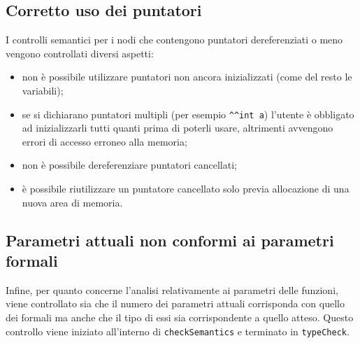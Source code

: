 \documentclass[../report.tex]{subfiles}
\begin{document}
\subsection{Corretto uso dei puntatori}\label{s:corretto-usi-puntatori}
I controlli semantici per i nodi che contengono puntatori dereferenziati o meno vengono controllati diversi aspetti:
\begin{itemize}
    \item non è possibile utilizzare puntatori non ancora inizializzati (come del resto le variabili);
    \item se si dichiarano puntatori multipli (per esempio \verb|^^int a|) l'utente è obbligato ad inizializzarli tutti quanti prima di poterli usare, altrimenti avvengono errori di accesso erroneo alla memoria;
    \item non è possibile dereferenziare puntatori cancellati;
    \item è possibile riutilizzare un puntatore cancellato solo previa allocazione di una nuova area di memoria.
\end{itemize}

\subsection{Parametri attuali non conformi ai parametri formali}\label{s:parametri-attuali-non-conformi-parametri-formali}
Infine, per quanto concerne l'analisi relativamente ai parametri delle funzioni, viene controllato sia che il numero dei parametri attuali corrisponda con quello dei formali ma anche che il tipo di essi sia corrispondente a quello atteso.
Questo controllo viene iniziato all'interno di \verb|checkSemantics| e terminato in \verb|typeCheck|.
\end{document}
